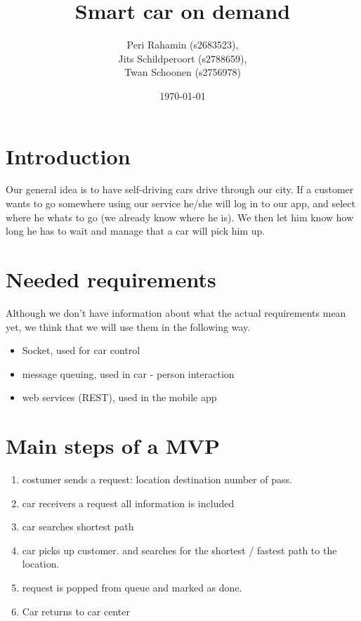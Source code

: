 \documentclass[8pt]{article}
\title{Smart car on demand}
\author{Peri Rahamin (s2683523),\\
  Jits Schildperoort (s2788659),\\
  Twan Schoonen (s2756978)}
\date{\today}
\begin{document}
\maketitle

\section{Introduction}

Our general idea is to have self-driving cars drive through our city.
If a customer wants to go somewhere using our service he/she will log in to our app, and select where he whats to go (we already know where he is).
We then let him know how long he has to wait and manage that a car will pick him up.

\section{Needed requirements}
Although we don't have information about what the actual requirements mean yet, we think that we will use them in the following way.
\begin{itemize}
\item Socket, used for car control
\item message queuing, used in car - person interaction
\item web services (REST), used in the mobile app
\end{itemize}


\section{Main steps of a MVP}

\begin{enumerate}
\item costumer sends a request:
  location destination number of pass.
\item car receivers a request
  all information is included
\item car searches shortest path

\item car picks up customer. and searches for the shortest / fastest path to the location.

\item request is popped from queue and marked as done.

\item Car returns to car center

\end{enumerate}
\end{document}
